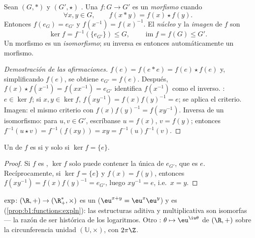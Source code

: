 \begin{definition}\label{def:b1:structures:morphism}
Sean $(G, *)$ y $(G', \star)$ . Una 
$f \colon G \to G'$ es un \emph{morfismo} cuando
\[
\forall x, y \in G, \qquad f(x * y) = f(x) \star f(y).
\]
Entonces $f(e_G) = e_{G'}$ y $f(x^{-1}) = f(x)^{-1}$. El
\emph{núcleo} y la \emph{imagen} de $f$ son
\[
\ker f = f^{-1}(\{e_{G'}\}) \leq G,
\qquad
\operatorname{im} f = f(G) \leq G' .
\]
Un morfismo  es un \emph{isomorfismo}; su  inversa
es entonces automáticamente un morfismo.
\end{definition}

\begin{proof}[Demostración de las afirmaciones]
$f(e) = f(e * e) = f(e)\star f(e)$ y, simplificando $f(e)$, se obtiene
$e_{G'} = f(e)$. Después, $f(x)\star f(x^{-1}) = f(x x^{-1}) = e_{G'}$
identifica $f(x^{-1})$ como el inverso. : $e \in \ker f$; si
$x, y \in \ker f$, $f(xy^{-1}) = f(x)f(y)^{-1} = e$; se aplica el
criterio. Imagen: el mismo criterio con $f(x)f(y)^{-1} = f(xy^{-1})$.
Inversa de un isomorfismo: para $u, v \in G'$, escríbanse $u = f(x)$,
$v = f(y)$; entonces $f^{-1}(u \star v) = f^{-1}(f(xy)) = xy =
f^{-1}(u) f^{-1}(v)$.
\end{proof}

\begin{proposition}\label{prop:b1:structures:kernel}
Un  de  $f$ es  si y solo si $\ker f =
\{e\}$.
\end{proposition}

\begin{proof}
Si $f$ es , $\ker f$ solo puede contener la única
 de $e_{G'}$, que es $e$. Recíprocamente, si
$\ker f = \{e\}$ y $f(x) = f(y)$, entonces $f(xy^{-1}) = f(x) f(y)^{-1}
= e_{G'}$, luego $xy^{-1} = e$,
i.e.\ $x = y$.
\end{proof}

\begin{example}\label{ex:b1:structures:expmorphism}
$\exp \colon (\R, +) \to (\R_+^*, \times)$ es un 
($\eu^{x+y} = \eu^x \eu^y$) y es 
(\cref{prop:b1:functions:expln}): las estructuras aditiva y
multiplicativa son isomorfas --- la razón de ser histórica de los
logaritmos. Otro : $\theta \mapsto \eu^{\iu\theta}$ de
$(\R, +)$ sobre la circunferencia unidad $(\mathbb{U}, \times)$, con 
$2\pi\Z$.
\end{example}


